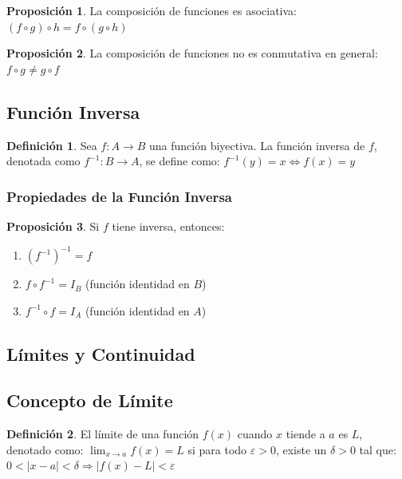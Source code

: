 \documentclass[12pt, a4paper, oneside]{book}
\theoremstyle{definition}
\newtheorem{definicion}{Definición}[chapter]
\newtheorem{proposicion}{Proposición}[chapter]
\begin{document}
\begin{proposicion}
La composición de funciones es asociativa:
$(f \circ g) \circ h = f \circ (g \circ h)$
\end{proposicion}

\begin{proposicion}
La composición de funciones no es conmutativa en general:
$f \circ g \neq g \circ f$
\end{proposicion}

\subsection{Función Inversa}

\begin{definicion}
Sea $f: A \rightarrow B$ una función biyectiva. La función inversa de $f$, denotada como $f^{-1}: B \rightarrow A$, se define como:
$f^{-1}(y) = x \Leftrightarrow f(x) = y$
\end{definicion}

\subsubsection{Propiedades de la Función Inversa}

\begin{proposicion}
Si $f$ tiene inversa, entonces:
\begin{enumerate}
    \item $(f^{-1})^{-1} = f$
    \item $f \circ f^{-1} = I_B$ (función identidad en $B$)
    \item $f^{-1} \circ f = I_A$ (función identidad en $A$)
\end{enumerate}
\end{proposicion}

\subsection{Límites y Continuidad}

\subsection{Concepto de Límite}

\begin{definicion}
El límite de una función $f(x)$ cuando $x$ tiende a $a$ es $L$, denotado como:
$\lim_{x \to a} f(x) = L$
si para todo $\varepsilon > 0$, existe un $\delta > 0$ tal que:
$0 < |x - a| < \delta \Rightarrow |f(x) - L| < \varepsilon$
\end{definicion}
\end{document}
